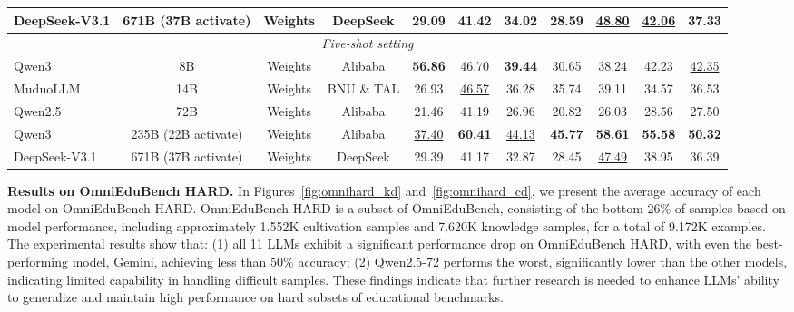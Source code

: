\begin{table}[tbp]
{\begin{tabular}{lccc|cccccc|c}
            DeepSeek-V3.1 & 671B (37B activate) & Weights & DeepSeek & 29.09 & 41.42 & 34.02 & 28.59 & \underline{48.80} & \underline{42.06} & 37.33 \\
            \midrule
            \multicolumn{11}{c}{\textcolor{myorange}{\textit{Five-shot setting}}} \\
            Qwen3 & 8B & Weights & Alibaba & \textbf{56.86} & 46.70 & \textbf{39.44} & 30.65 & 38.24 & 42.23 & \underline{42.35} \\
            MuduoLLM & 14B & Weights & BNU \& TAL & 26.93 & \underline{46.57} & 36.28 & 35.74 & 39.11 & 34.57 & 36.53 \\
            Qwen2.5 & 72B & Weights & Alibaba & 21.46 & 41.19 & 26.96 & 20.82 & 26.03 & 28.56 & 27.50 \\
            Qwen3 & 235B (22B activate) & Weights & Alibaba & \underline{37.40} & \textbf{60.41} & \underline{44.13} & \textbf{45.77} & \textbf{58.61} & \textbf{55.58} & \textbf{50.32} \\
            DeepSeek-V3.1 & 671B (37B activate) & Weights & DeepSeek & 29.39 & 41.17 & 32.87 & 28.45 & \underline{47.49} & 38.95 & 36.39 \\
            \bottomrule
        \end{tabular}}
    \label{tab:few-shot_kd}
\end{table}

\textbf{Results on OmniEduBench HARD.} In Figures~\ref{fig:omnihard_kd} and~\ref{fig:omnihard_cd}, we present the average accuracy of each model on OmniEduBench HARD. OmniEduBench HARD is a subset of OmniEduBench, consisting of the bottom 26\% of samples based on model performance, including approximately 1.552K cultivation samples and 7.620K knowledge samples, for a total of 9.172K examples. The experimental results show that: (1) all 11 LLMs exhibit a significant performance drop on OmniEduBench HARD, with even the best-performing model, Gemini, achieving less than 50\% accuracy; (2) Qwen2.5-72 performs the worst, significantly lower than the other models, indicating limited capability in handling difficult samples. These findings indicate that further research is needed to enhance LLMs’ ability to generalize and maintain high performance on hard subsets of educational benchmarks.

